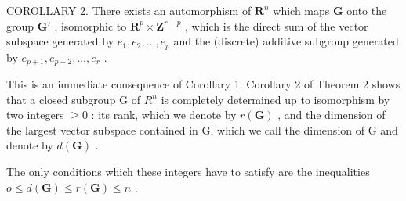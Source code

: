 COROLLARY 2. There exists an automorphism of \(\mathbf{R}^n\) which maps \(\mathbf{G}\) onto the group \(\mathbf{G}'\) , isomorphic to \(\mathbf{R}^p \times \mathbf{Z}^{r-p}\) , which is the direct sum of the vector subspace generated by \(e_1, e_2, \ldots, e_p\) and the (discrete) additive subgroup generated by \(e_{p+1}, e_{p+2}, \ldots, e_r\) .

This is an immediate consequence of Corollary 1. Corollary 2 of Theorem 2 shows that a closed subgroup G of \(R^{n}\) is completely determined up to isomorphism by two integers \(\geqslant 0\) : its rank, which we denote by \(r(\mathbf{G})\) , and the dimension of the largest vector subspace contained in G, which we call the dimension of G and denote by \(d(\mathbf{G})\) .

The only conditions which these integers have to satisfy are the inequalities \(o \leqslant d(\mathbf{G}) \leqslant r(\mathbf{G}) \leqslant n\) .

